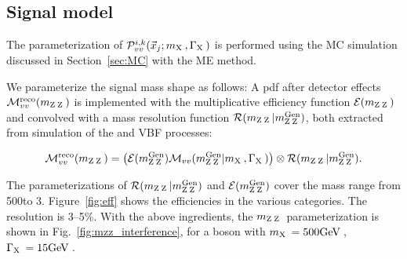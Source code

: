  \subsection{Signal model}
 \label{sec:Signalmodel}

 The parameterization of $\mathcal{P}^{i,k}_{vv} (\vec{x}_{j}; m_{\mathrm{X}\hspace{0.2em}}, \Gamma_{\mathrm{X}\hspace{0.2em}})$ is performed using the MC simulation
 discussed in Section~\ref{sec:MC} with the ME method.

 We parameterize the signal mass shape as follows:
 A pdf after detector effects ${\cal M}^{\mathrm{reco}}_{vv}(m_{\mathrm{Z}\hspace{0.2em}\mathrm{Z}\hspace{0.2em}})$ is implemented with the multiplicative efficiency function  ${\cal E}(m_{\mathrm{Z}\hspace{0.2em}\mathrm{Z}\hspace{0.2em}})$ and convolved with a mass resolution function
 ${\cal R}(m_{\mathrm{Z}\hspace{0.2em}\mathrm{Z}\hspace{0.2em}}|m^{\mathrm{Gen}}_{\mathrm{Z}\hspace{0.2em}\mathrm{Z}\hspace{0.2em}})$, both extracted from simulation of the \ggF and VBF processes:

 \begin{eqnarray}
 {\cal M}^{\mathrm{reco}}_{vv}(m_{\cPZ\cPZ})=
 \left({\cal E}(m_{\cPZ\cPZ}^{\mathrm{Gen}}) {\cal M}_{vv}(m^{\mathrm{Gen}}_{\cPZ\cPZ}|\mX,\GX)\right) \otimes {\cal R}(m_{\cPZ\cPZ}|m^{\mathrm{Gen}}_{\cPZ\cPZ}).
 \label{eq:signalpdf1D}
 \end{eqnarray}

 The parameterizations of ${\cal R}(m_{\mathrm{Z}\hspace{0.2em}\mathrm{Z}\hspace{0.2em}}|m^{\mathrm{Gen}}_{\mathrm{Z}\hspace{0.2em}\mathrm{Z}\hspace{0.2em}})$ and ${\cal E}(m_{\mathrm{Z}\hspace{0.2em}\mathrm{Z}\hspace{0.2em}}^{\mathrm{Gen}})$ cover the mass
 range from 500\GeV to 3\TeV. Figure~\ref{fig:eff} shows the efficiencies in the various categories. The resolution is 3--5\%. With the above ingredients, the $m_{\mathrm{Z}\hspace{0.2em}\mathrm{Z}\hspace{0.2em}}$ parameterization is shown in Fig.~\ref{fig:mzz_interference}, for a boson with $m_{\mathrm{X}\hspace{0.2em}} = 500\mathrm{GeV}\hspace{0.2em}$, $\Gamma_{\mathrm{X}\hspace{0.2em}} = 15\mathrm{GeV}\hspace{0.2em}$.

